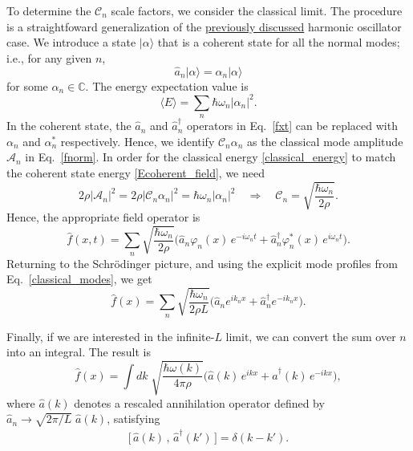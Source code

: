 \documentclass[prx,12pt]{revtex4-2}
\begin{document}
To determine the $\mathcal{C}_n$ scale factors, we consider the
classical limit.  The procedure is a straightfoward generalization of
the \hyperref[sec:ho]{previously discussed} harmonic oscillator case.
We introduce a state $|\alpha\rangle$ that is a coherent state for all
the normal modes; i.e., for any given $n$,
\begin{equation}
  \hat{a}_n |\alpha\rangle = \alpha_n |\alpha\rangle
\end{equation}
for some $\alpha_n \in \mathbb{C}$.  The energy expectation value is
\begin{equation}
  \langle E\rangle = \sum_n \hbar \omega_n |\alpha_n|^2.
  \label{Ecoherent_field}
\end{equation}
In the coherent state, the $\hat{a}_n$ and $\hat{a}_n^\dagger$
operators in Eq.~\eqref{fxt} can be replaced with $\alpha_n$ and
$\alpha_n^*$ respectively.  Hence, we identify $\mathcal{C}_n
\alpha_n$ as the classical mode amplitude $\mathcal{A}_n$ in
Eq.~\eqref{fnorm}.  In order for the classical energy
\eqref{classical_energy} to match the coherent state energy
\eqref{Ecoherent_field}, we need
\begin{equation}
  2\rho |\mathcal{A}_n|^2 = 2 \rho |\mathcal{C}_n\alpha_n|^2
  = \hbar \omega_n |\alpha_n|^2 \quad \Rightarrow \quad
  \mathcal{C}_n = \sqrt{\frac{\hbar\omega_n}{2\rho}}.
\end{equation}
Hence, the appropriate field operator is
\begin{equation}
  \hat{f}(x,t) = \sum_n \sqrt{\frac{\hbar\omega_n}{2\rho}}
  \Big(\hat{a}_n \varphi_n(x) \,e^{-i\omega_nt}
  + \hat{a}_n^\dagger \varphi_n^*(x) \, e^{i\omega_nt} \Big).
\end{equation}
Returning to the Schr\"odinger picture, and using the explicit mode
profiles from Eq.~\eqref{classical_modes}, we get
\begin{equation}
  \hat{f}(x) = \sum_n \sqrt{\frac{\hbar\omega_n}{2\rho L}}
  \Big(\hat{a}_n e^{ik_n x}
  + \hat{a}_n^\dagger e^{-ik_n x} \Big).
\end{equation}

Finally, if we are interested in the infinite-$L$ limit, we can
convert the sum over $n$ into an integral.
The result is
\begin{equation}
  \hat{f}(x) = \int dk\; \sqrt{\frac{\hbar\omega(k)}{4\pi\rho}}
  \Big(\hat{a}(k)\, e^{ik x} + \hat{a}^\dagger(k)\, e^{-ik x} \Big),
\end{equation}
where $\hat{a}(k)$ denotes a rescaled annihilation operator defined by
$\hat{a}_n \rightarrow \sqrt{2\pi/L}\; \hat{a}(k)$, satisfying
\begin{align}
  \Big[\,\hat{a}(k)\,,\, \hat{a}^\dagger(k')\,\Big] = \delta(k-k').
\end{align}
\end{document}
